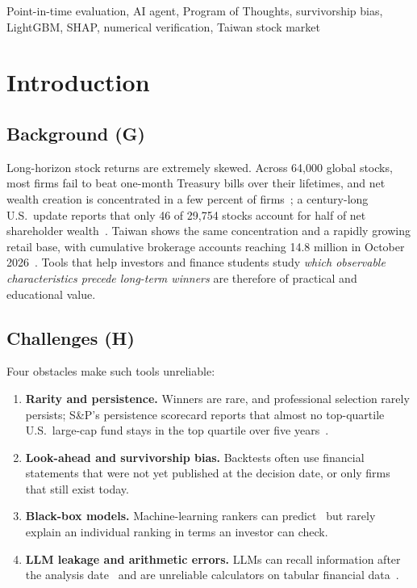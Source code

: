 \documentclass[conference]{IEEEtran}
\begin{document}
\begin{IEEEkeywords}
Point-in-time evaluation, AI agent, Program of Thoughts, survivorship bias, LightGBM, SHAP, numerical verification, Taiwan stock market
\end{IEEEkeywords}

\section{Introduction}

\subsection{Background (G)}
Long-horizon stock returns are extremely skewed. Across 64,000 global stocks, most firms fail to beat one-month Treasury bills over their lifetimes, and net wealth creation is concentrated in a few percent of firms~\cite{b2}; a century-long U.S.\ update reports that only 46 of 29,754 stocks account for half of net shareholder wealth~\cite{b1}. Taiwan shows the same concentration and a rapidly growing retail base, with cumulative brokerage accounts reaching 14.8 million in October 2026~\cite{b11}. Tools that help investors and finance students study \emph{which observable characteristics precede long-term winners} are therefore of practical and educational value.

\subsection{Challenges (H)}
Four obstacles make such tools unreliable:
\begin{enumerate}
\item \textbf{Rarity and persistence.} Winners are rare, and professional selection rarely persists; S\&P's persistence scorecard reports that almost no top-quartile U.S.\ large-cap fund stays in the top quartile over five years~\cite{b3}.
\item \textbf{Look-ahead and survivorship bias.} Backtests often use financial statements that were not yet published at the decision date, or only firms that still exist today.
\item \textbf{Black-box models.} Machine-learning rankers can predict~\cite{b9} but rarely explain an individual ranking in terms an investor can check.
\item \textbf{LLM leakage and arithmetic errors.} LLMs can recall information after the analysis date~\cite{b5,b6,b7} and are unreliable calculators on tabular financial data~\cite{b8}.
\end{enumerate}
\end{document}
